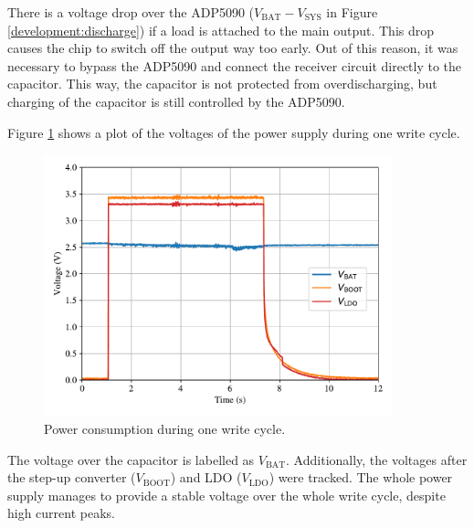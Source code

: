 There is a voltage drop over the ADP5090 ($V_{\text{BAT}}-V_{\text{SYS}}$ in Figure \ref{development:discharge}) if a load is attached to the main output.
This drop causes the chip to switch off the output way too early.
Out of this reason, it was necessary to bypass the ADP5090 and connect the receiver circuit directly to the capacitor.
This way, the capacitor is not protected from overdischarging, but charging of the capacitor is still controlled by the ADP5090.

Figure \ref{results:v} shows a plot of the voltages of the power supply during one write cycle. 
\begin{figure}[ht]
	\centering
	\includegraphics[width=0.9\textwidth]{5-results/power_supply/plot/v.pdf}
	\caption{Power consumption during one write cycle.\label{results:v}}
\end{figure}
The voltage over the capacitor is labelled as $V_{\text{BAT}}$.
Additionally, the voltages after the step-up converter ($V_{\text{BOOT}}$) and LDO ($V_{\text{LDO}}$) were tracked.
The whole power supply manages to provide a stable voltage over the whole write cycle, despite high current peaks.